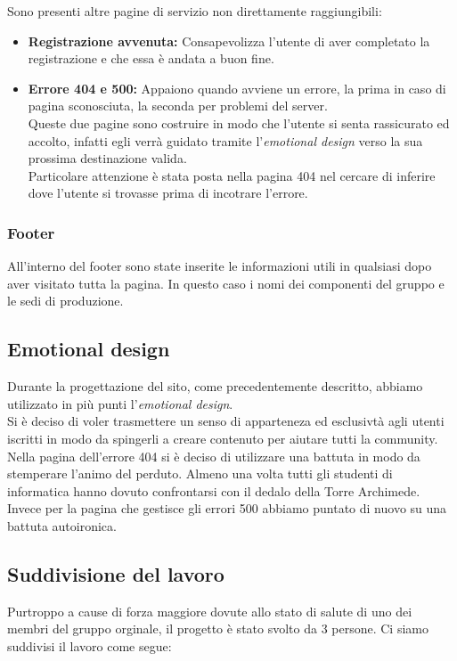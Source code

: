 Sono presenti altre pagine di servizio non direttamente raggiungibili:
\begin{itemize}
    \item \textbf{Registrazione avvenuta:} Consapevolizza l'utente di aver completato la registrazione e che essa è andata a buon fine.
    \item \textbf{Errore 404 e 500:} Appaiono quando avviene un errore, la prima in caso di pagina sconosciuta, la seconda per problemi del server.\\
    Queste due pagine sono costruire in modo che l'utente si senta rassicurato ed accolto, infatti egli verrà guidato tramite l'\textit{emotional design} verso la sua prossima destinazione valida.\\
    Particolare attenzione è stata posta nella pagina 404 nel cercare di inferire dove l'utente si trovasse prima di incotrare l'errore.
\end{itemize}

\subsubsection{Footer}
All'interno del footer sono state inserite le informazioni utili in qualsiasi dopo aver visitato tutta la pagina. In questo caso i nomi dei componenti del gruppo e le sedi di produzione.

\subsection{Emotional design}
Durante la progettazione del sito, come precedentemente descritto, abbiamo utilizzato in più punti l'\textit{emotional design}.\\
Si è deciso di voler trasmettere un senso di apparteneza ed esclusivtà agli utenti iscritti in modo da spingerli a creare contenuto per aiutare tutti la community.
Nella pagina dell'errore 404 si è deciso di utilizzare una battuta in modo da stemperare l'animo del perduto. Almeno una volta tutti gli studenti di informatica hanno dovuto confrontarsi con il dedalo della Torre Archimede. Invece per la pagina che gestisce gli errori 500 abbiamo puntato di nuovo su una battuta autoironica.

\subsection{Suddivisione del lavoro}
Purtroppo a cause di forza maggiore dovute allo stato di salute di uno dei membri del gruppo orginale, il progetto è stato svolto da 3 persone. Ci siamo suddivisi il lavoro come segue:


